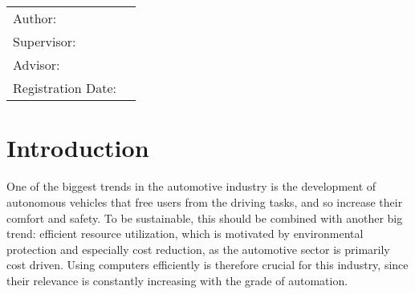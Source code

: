 
\begin{center}

{\Large\MakeUppercase{\getFaculty{}}}\\

\vspace{5mm}
{\large\MakeUppercase{\getUniversity{}}}\\

\vspace{10mm}
{\Large \getDoctype{}}

\vspace{10mm}
{\Large\bfseries \getTitle{}}

\vspace{10mm}
{\Large\bfseries \foreignlanguage{ngerman}{\getTitleGer{}}}

\vspace{15mm}
\begin{tabular}{l l}
	Author:          & \getAuthor{} \\
	Supervisor:      & \getSupervisor{} \\
	Advisor:         & \getAdvisor{} \\
	Registration Date: & \getSubmissionDate{} \\
\end{tabular}

\vspace{20mm}
\end{center}

\section*{Introduction}\label{section:introduction}
One of the biggest trends in the automotive industry is the development of autonomous vehicles that free users from the driving tasks, and so increase their comfort and safety. To be sustainable, this should be combined with another big trend: efficient resource utilization, which is motivated by environmental protection and especially cost reduction, as the automotive sector is primarily cost driven. Using computers efficiently is therefore crucial for this industry, since their relevance is constantly increasing with the grade of automation.

